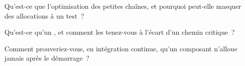 \begin{interviewq}\label{iq:ll:cpp-for-latency-i-memory:4}
Qu'est-ce que l'optimisation des petites chaînes, et pourquoi peut-elle masquer des allocations à un test~?
\end{interviewq}

\begin{interviewq}\label{iq:ll:cpp-for-latency-i-memory:5}
Qu'est-ce qu'un , et comment les tenez-vous à l'écart d'un chemin critique~?
\end{interviewq}

\begin{interviewq}\label{iq:ll:cpp-for-latency-i-memory:6}
Comment prouveriez-vous, en intégration continue, qu'un composant n'alloue jamais après le démarrage~?
\end{interviewq}
